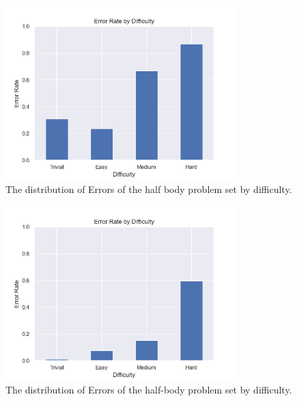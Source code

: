 \begin{figure}
  \centering
  \includegraphics[width=0.8\textwidth]{figures/Data/dist_half_body/Error_Rate_by_Difficulty.png}
  \caption[Error Distribution of the Half Body by difficulty]{The distribution of Errors of the half body problem set by difficulty.}
  \label{fig:hb_diff_dist}
\end{figure}

\begin{figure}
  \centering
  \includegraphics[width=0.8\textwidth]{figures/Data/dist_limbs/Error_Rate_by_Difficulty.png}
  \caption[Error Distribution of the limbs by difficulty]{The distribution of Errors of the half-body problem set by difficulty.}
  \label{fig:lb_diff_dist}
\end{figure}

